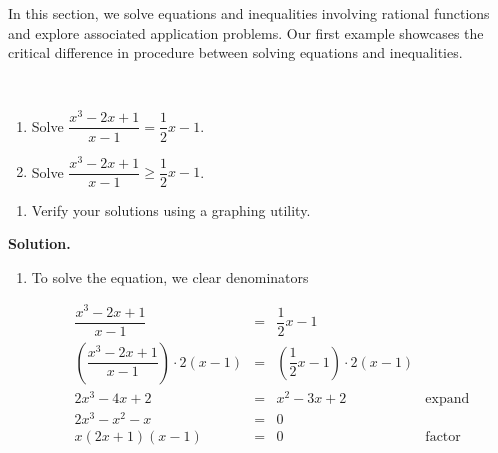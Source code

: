 
\setcounter{footnote}{0}

\label{RationalIneq}

In this section, we solve equations and inequalities involving rational functions and explore associated application problems. Our first example showcases the critical difference in procedure between solving equations and inequalities.

\begin{ex} \label{rationalinequalityex}  $~$

\begin{multicols}{2}
\begin{enumerate}

\item  Solve $\dfrac{x^3-2x+1}{x-1} = \dfrac{1}{2}x-1$.

\item  Solve $\dfrac{x^3-2x+1}{x-1} \geq \dfrac{1}{2}x-1$.

\setcounter{HW}{\value{enumi}}
\end{enumerate}
\end{multicols}

\begin{enumerate}
\setcounter{enumi}{\value{HW}}

\item  Verify your solutions using a graphing utility.

\end{enumerate}

{ \bf Solution.} 

\begin{enumerate}

\item  To solve the equation, we clear denominators

\[ \begin{array}{rclr}

\dfrac{x^3-2x+1}{x-1} & = & \dfrac{1}{2}x-1 & \\ [10pt]

\left(\dfrac{x^3-2x+1}{x-1}\right) \cdot 2(x-1) & = & \left( \dfrac{1}{2}x-1 \right) \cdot 2(x-1) & \\ [10pt]

2x^3 - 4x + 2 & = & x^2-3x+2 & \text{expand} \\

2x^3 -x^2 - x & = & 0 & \\

x(2x+1)(x-1) & = & 0 & \text{factor}\\


\end{array}\]
\end{enumerate}
\end{ex}
